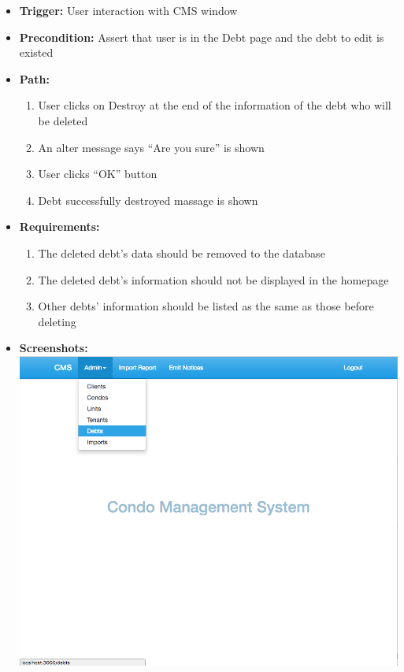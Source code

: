 \begin{itemize}
  \item[] \textbf{Trigger:} User interaction with CMS window
  \item[] \textbf{Precondition:} Assert that user is in the Debt page and the debt to edit is existed
  \item[] \textbf{Path:}
    \begin{enumerate}
      \item User clicks on Destroy at the end of the information of the debt who will be deleted
      \item An alter message says ``Are you sure'' is shown
      \item User clicks ``OK'' button
      \item Debt successfully destroyed massage is shown
    \end{enumerate}
  \item[] \textbf{Requirements:}
    \begin{enumerate}
      \item The deleted debt’s data should be removed to the database
      \item The deleted debt’s information should not be displayed in the homepage
      \item Other debts’ information should be listed as the same as those before deleting
    \end{enumerate}
  \item[] \textbf{Screenshots:}\\
    \includegraphics[scale=0.25]{./images/ss/debt/delete/1.png}

\end{itemize}
